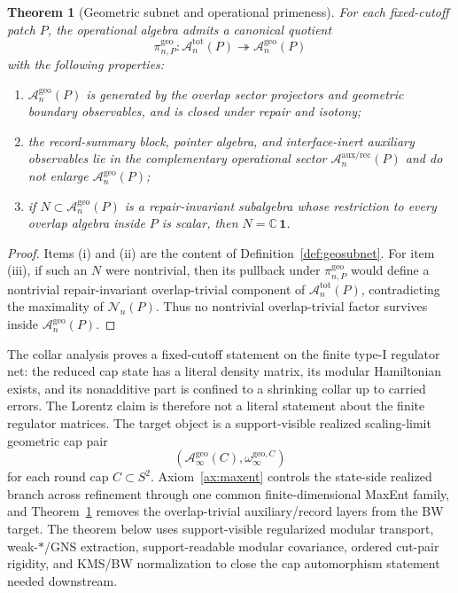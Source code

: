 \documentclass[11pt]{article}
\newtheorem{theorem}{Theorem}[section]
\begin{document}
\begin{theorem}[Geometric subnet and operational primeness]\label{thm:geosubnet}
For each fixed-cutoff patch \(P\), the operational algebra admits a canonical quotient
\[
\pi_{n,P}^{\mathrm{geo}}:\mathcal A_n^{\mathrm{tot}}(P)\twoheadrightarrow \mathcal A_n^{\mathrm{geo}}(P)
\]
with the following properties:
\begin{enumerate}[label=\textup{(\roman*)},leftmargin=2em]
\item \(\mathcal A_n^{\mathrm{geo}}(P)\) is generated by the overlap sector projectors and geometric boundary observables, and is closed under repair and isotony;
\item the record-summary block, pointer algebra, and interface-inert auxiliary observables lie in the complementary operational sector \(\mathcal A_n^{\mathrm{aux/rec}}(P)\) and do not enlarge \(\mathcal A_n^{\mathrm{geo}}(P)\);
\item if \(N\subset \mathcal A_n^{\mathrm{geo}}(P)\) is a repair-invariant subalgebra whose restriction to every overlap algebra inside \(P\) is scalar, then \(N=\mathbb C\,\mathbf 1\).
\end{enumerate}
\end{theorem}

\begin{proof}
Items \textup{(i)} and \textup{(ii)} are the content of Definition~\ref{def:geosubnet}. For item \textup{(iii)}, if such an \(N\) were nontrivial, then its pullback under \(\pi_{n,P}^{\mathrm{geo}}\) would define a nontrivial repair-invariant overlap-trivial component of \(\mathcal A_n^{\mathrm{tot}}(P)\), contradicting the maximality of \(\mathcal N_n(P)\). Thus no nontrivial overlap-trivial factor survives inside \(\mathcal A_n^{\mathrm{geo}}(P)\).
\end{proof}

The collar analysis proves a fixed-cutoff statement on the finite type-I regulator net: the reduced cap state has a literal density matrix, its modular Hamiltonian exists, and its nonadditive part is confined to a shrinking collar up to carried errors. The Lorentz claim is therefore not a literal statement about the finite regulator matrices. The target object is a support-visible realized scaling-limit geometric cap pair
\[
(\mathcal A_\infty^{\mathrm{geo}}(C),\omega_\infty^{\mathrm{geo},C})
\]
for each round cap \(C\subset S^2\). Axiom~\ref{ax:maxent} controls the state-side realized branch across refinement through one common finite-dimensional MaxEnt family, and Theorem~\ref{thm:geosubnet} removes the overlap-trivial auxiliary/record layers from the BW target. The theorem below uses support-visible regularized modular transport, weak-\(*\)/GNS extraction, support-readable modular covariance, ordered cut-pair rigidity, and KMS/BW normalization to close the cap automorphism statement needed downstream.
\end{document}
